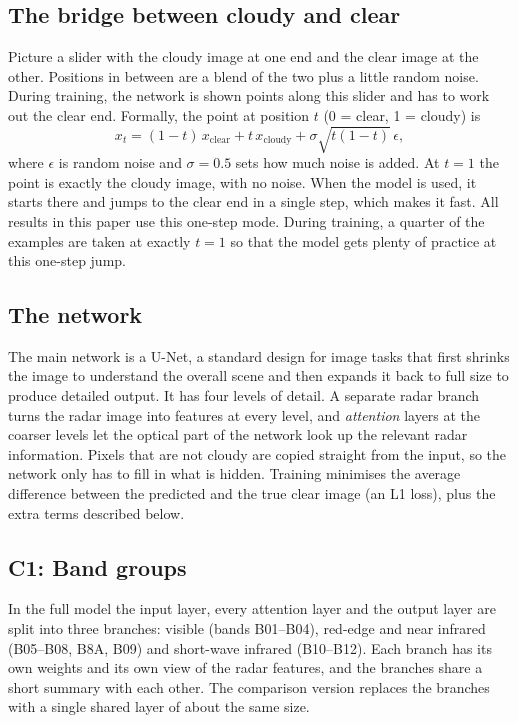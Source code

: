 \documentclass[conference]{IEEEtran}
\begin{document}
\subsection{The bridge between cloudy and clear}
Picture a slider with the cloudy image at one end and the clear image at the other. Positions in
between are a blend of the two plus a little random noise. During training, the network is shown
points along this slider and has to work out the clear end. Formally, the point at position $t$
(0 = clear, 1 = cloudy) is
\begin{equation}
x_t = (1-t)\,x_{\mathrm{clear}} + t\,x_{\mathrm{cloudy}} + \sigma\sqrt{t(1-t)}\,\epsilon,
\end{equation}
where $\epsilon$ is random noise and $\sigma = 0.5$ sets how much noise is added. At $t = 1$ the
point is exactly the cloudy image, with no noise. When the model is used, it starts there and
jumps to the clear end in a single step, which makes it fast. All results in this paper use this
one-step mode. During training, a quarter of the examples are taken at exactly $t = 1$ so that
the model gets plenty of practice at this one-step jump.

\subsection{The network}
The main network is a U-Net, a standard design for image tasks that first shrinks the image to
understand the overall scene and then expands it back to full size to produce detailed output.
It has four levels of detail. A separate radar branch turns the radar image into features at
every level, and \emph{attention} layers at the coarser levels let the optical part of the network
look up the relevant radar information. Pixels that are not cloudy are copied straight from the
input, so the network only has to fill in what is hidden. Training minimises the average
difference between the predicted and the true clear image (an L1 loss), plus the extra terms
described below.

\subsection{C1: Band groups}
In the full model the input layer, every attention layer and the output layer are split into
three branches: visible (bands B01--B04), red-edge and near infrared (B05--B08, B8A, B09) and
short-wave infrared (B10--B12). Each branch has its own weights and its own view of the radar
features, and the branches share a short summary with each other. The comparison version replaces
the branches with a single shared layer of about the same size.
\end{document}
